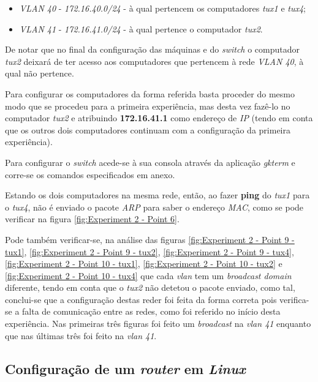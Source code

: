 \documentclass[a4paper]{article}
\begin{document}
	\begin{itemize}
	\item \textit{VLAN 40} - \textit{172.16.40.0/24} -  à qual pertencem os computadores \textit{tux1} e \textit{tux4};
	\item \textit{VLAN 41} - \textit{172.16.41.0/24} -  à qual pertence o computador \textit{tux2}.
	\end{itemize}

	De notar que no final da configuração das máquinas e do \textit{switch} o computador \textit{tux2} deixará de ter acesso aos computadores que pertencem à rede \textit{VLAN 40}, à qual não pertence.

Para configurar os computadores da forma referida basta proceder do mesmo modo que se procedeu para a primeira experiência, mas desta vez fazê-lo no computador \textit{tux2} e atribuindo \textbf{172.16.41.1} como endereço de \textit{IP} (tendo em conta que os outros dois computadores continuam com a configuração da primeira experiência).

Para configurar o \textit{switch} acede-se à sua consola através da aplicação \textit{gkterm} e corre-se os comandos especificados em anexo.

	Estando os dois computadores na mesma rede, então, ao fazer \textbf{ping} do \textit{tux1} para o \textit{tux4}, não é enviado o pacote \textit{ARP} para saber o endereço \textit{MAC}, como se pode verificar na figura \ref{fig:Experiment 2 - Point 6}.

	Pode também verificar-se, na análise das figuras \ref{fig:Experiment 2 - Point 9 - tux1}, \ref{fig:Experiment 2 - Point 9 - tux2}, \ref{fig:Experiment 2 - Point 9 - tux4}, \ref{fig:Experiment 2 - Point 10 - tux1}, \ref{fig:Experiment 2 - Point 10 - tux2} e \ref{fig:Experiment 2 - Point 10 - tux4} que cada \textit{vlan} tem um \textit{broadcast domain} diferente, tendo em conta que o \textit{tux2} não detetou o pacote enviado, como tal, conclui-se que a configuração destas reder foi feita da forma correta pois verifica-se a falta de comunicação entre as redes, como foi referido no início desta experiência. Nas primeiras três figuras foi feito um \textit{broadcast} na \textit{vlan 41} enquanto que nas últimas três foi feito na \textit{vlan 41}.


	\subsection{Configuração de um \textit{router} em \textit{Linux}}
\end{document}
